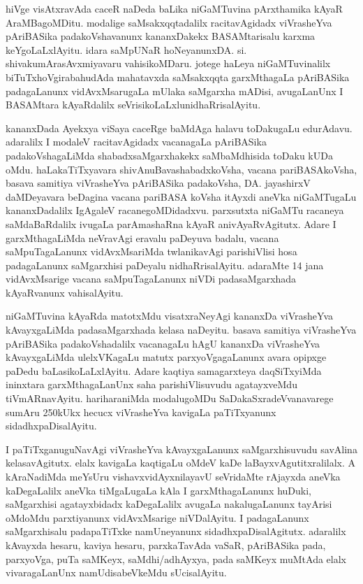 \medskip

hiVge visAtxravAda caceR naDeda baLika niGaMTuvina pArxthamika kAyaR AraMBagoMDitu. modalige saMsakxqqta\-dalilx racita\-vAgidadx viVrasheYva pAriBASika padakoVshavanunx kananxDakekx BASAMtarisalu karxma keYgoLaLxlAyitu. idara saMpUNaR \hbox{hoNeyanunx}\break DA. si. shivakumAra\-sAvxmiyavaru vahisikoMDaru. jotege haLeya niGaMTuvinalilx biTuTxhoVgirabahudAda mahatavxda saMsakxqqta garxMthagaLa pAriBASika padagaLanunx vidAvxMsarugaLa mUlaka saMgarxha mADisi, avugaLanUnx I BASAMtara kAyaRdalilx seVrisikoLaLxlu\break nidhaRrisalAyitu.

\medskip

kananxDada Ayekxya viSaya caceRge baMdAga halavu toDakugaLu edurAdavu. adaralilx I modaleV racitavAgidadx vacanagaLa pAriBASika padakoVshagaLiMda shabadxsaMgarxhakekx saMbaMdhisida toDaku kUDa oMdu. haLakaTiTxyavara shivAnuBavashabadxkoVsha, vacana pariBASA\-koVsha, basava samitiya viVrasheYva pAriBASika padakoVsha, DA. jayashirxV daMDeyavara beDagina vacana pariBASA koVsha itAyxdi aneVka niGaMTugaLu kananxDadalilx IgAgaleV racanegoMDidadxvu. parxsutxta niGaMTu racaneya saMdaBaRdalilx ivugaLa parAmashaRna kAyaR anivAyaRvAgitutx. Adare I garxMthagaLiMda neVravAgi eravalu paDeyuva badalu, vacana saMpuTagaLanunx vidAvxMsariMda twlanika\-vAgi parishiVlisi hosa padagaLanunx saMgarxhisi paDeyalu nidhaRrisalAyitu. adaraMte 14 jana vidAvxMsarige vacana saMpuTagaLanunx niVDi padasaMgarxhada kAyaRvanunx vahisalAyitu.

\medskip

niGaMTuvina kAyaRda matotxMdu visatxraNeyAgi kananxDa viVrasheYva kAvayxgaLiMda padasaMgarxhada kelasa naDeyitu. basava \hbox{samitiya} viVrasheYva pAriBASika padakoVshadalilx vacanagaLu hAgU kananxDa viVrasheYva kAvayxgaLiMda ulelxVKagaLu matutx parxyoVga\-gaLanunx avara opipxge paDedu baLasikoLaLxlAyitu. Adare kaqtiya samagarxteya daqSiTxyiMda ininxtara garxMthagaLanUnx saha parishiVlisuvudu agatayxveMdu tiVmARnavAyitu. hariharaniMda modalugoMDu SaDakaSxradeVvanavarege sumAru 250kUkx hecucx viVrasheYva kavigaLa paTiTxyanunx sidadhxpaDisalAyitu. 

\medskip

I paTiTxganuguNavAgi viVrasheYva kAvayxgaLanunx saMgarxhisuvudu savAlina kelasavAgitutx. elalx kavigaLa kaqtigaLu oMdeV kaDe laBayxvAgutitxralilalx. A kAraNadiMda meYsUru vishavxvidAyxnilayavU seVridaMte rAjayxda aneVka kaDegaLalilx aneVka tiMgaLugaLa kAla I garxMthagaLanunx huDuki, saMgarxhisi agatayxbidadx kaDegaLalilx avugaLa nakalugaLanunx tayArisi oMdoMdu parxtiyanunx vidAvxMsarige niVDa\-lAyitu. I padagaLanunx saMgarxhisalu padapaTiTxke namUneyanunx sidadhxpaDisalAgitutx. adaralilx kAvayxda hesaru, kaviya hesaru, parxkaTavAda vaSaR, pAriBASika pada, parxyoVga, puTa saMKeyx, saMdhi/adhAyxya, pada saMKeyx muMtAda elalx vivaragaLanUnx namUdisa\-beVkeMdu sUcisalAyitu.

